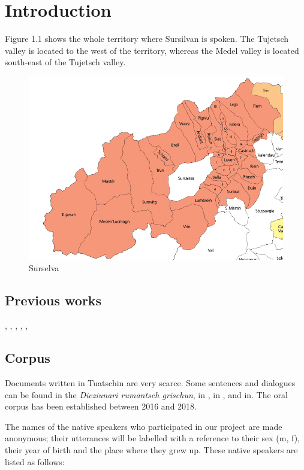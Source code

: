 \chapter{Introduction}

 

Figure 1.1 shows the whole territory where Sursilvan is spoken. The Tujetsch valley is located to the west of the territory, whereas the Medel valley is located south-east of the Tujetsch valley.


\begin{figure}
\includegraphics[height=.5\textheight]{figures/Surselva}
\caption{Surselva}

\end{figure}


\section{Previous works}

\citet{Caduff1951}, \citet{Gartner1910}, \citet{Gartner1910}, \citet{Valär2013b}, \citet{Valär2013a},


\section{Corpus}
Documents written in Tuatschin are very scarce. Some sentences and dialogues can be found in the \textit{Dicziunari rumantsch grischun}, in \citet{Büchli1966}, in \citet{Berther1998}, and in. The oral corpus has been established between 2016 and 2018.

The names of the native speakers who participated in our project are made anonymous; their utterances will be labelled with a reference to their sex (m, f), their year of birth and the place where they grew up. These native speakers are listed as follows:


